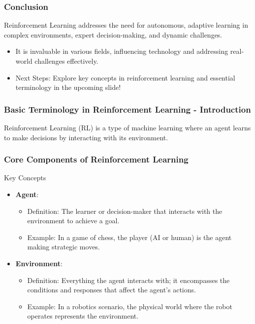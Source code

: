 \documentclass[aspectratio=169]{beamer}
\begin{document}
\begin{frame}[fragile]
    \frametitle{Conclusion}
    Reinforcement Learning addresses the need for autonomous, adaptive learning in complex environments, expert decision-making, and dynamic challenges. 
    \begin{itemize}
        \item It is invaluable in various fields, influencing technology and addressing real-world challenges effectively.
        \item Next Steps: Explore key concepts in reinforcement learning and essential terminology in the upcoming slide!
    \end{itemize}
\end{frame}

\begin{frame}[fragile]
    \frametitle{Basic Terminology in Reinforcement Learning - Introduction}
    Reinforcement Learning (RL) is a type of machine learning where an agent learns to make decisions by interacting with its environment. 
\end{frame}

\begin{frame}[fragile]
    \frametitle{Core Components of Reinforcement Learning}
    \begin{block}{Key Concepts}
        \begin{itemize}
            \item \textbf{Agent}:
                \begin{itemize}
                    \item Definition: The learner or decision-maker that interacts with the environment to achieve a goal.
                    \item Example: In a game of chess, the player (AI or human) is the agent making strategic moves.
                \end{itemize}
            \item \textbf{Environment}:
                \begin{itemize}
                    \item Definition: Everything the agent interacts with; it encompasses the conditions and responses that affect the agent's actions.
                    \item Example: In a robotics scenario, the physical world where the robot operates represents the environment.
                \end{itemize}
        \end{itemize}
    \end{block}
\end{frame}
\end{document}
